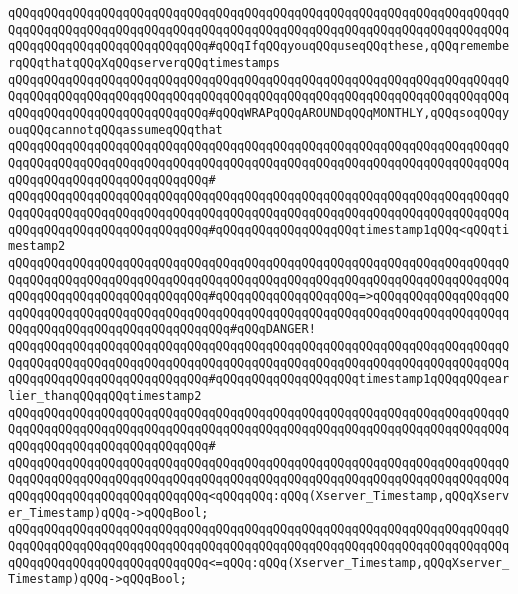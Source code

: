 \newline
\verb|qQQqqQQqqQQqqQQqqQQqqQQqqQQqqQQqqQQqqQQqqQQqqQQqqQQqqQQqqQQqqQQqqQQqqQQqqQQqqQQqqQQqqQQqqQQqqQQqqQQqqQQqqQQqqQQqqQQqqQQqqQQqqQQqqQQqqQQqqQQqqQQqqQQqqQQqqQQqqQQqqQQqqQQq#qQQqIfqQQqyouqQQquseqQQqthese,qQQqrememberqQQqthatqQQqXqQQqserverqQQqtimestamps|\newline
\verb|qQQqqQQqqQQqqQQqqQQqqQQqqQQqqQQqqQQqqQQqqQQqqQQqqQQqqQQqqQQqqQQqqQQqqQQqqQQqqQQqqQQqqQQqqQQqqQQqqQQqqQQqqQQqqQQqqQQqqQQqqQQqqQQqqQQqqQQqqQQqqQQqqQQqqQQqqQQqqQQqqQQqqQQq#qQQqWRAPqQQqAROUNDqQQqMONTHLY,qQQqsoqQQqyouqQQqcannotqQQqassumeqQQqthat|\newline
\verb|qQQqqQQqqQQqqQQqqQQqqQQqqQQqqQQqqQQqqQQqqQQqqQQqqQQqqQQqqQQqqQQqqQQqqQQqqQQqqQQqqQQqqQQqqQQqqQQqqQQqqQQqqQQqqQQqqQQqqQQqqQQqqQQqqQQqqQQqqQQqqQQqqQQqqQQqqQQqqQQqqQQqqQQq#|\newline
\verb|qQQqqQQqqQQqqQQqqQQqqQQqqQQqqQQqqQQqqQQqqQQqqQQqqQQqqQQqqQQqqQQqqQQqqQQqqQQqqQQqqQQqqQQqqQQqqQQqqQQqqQQqqQQqqQQqqQQqqQQqqQQqqQQqqQQqqQQqqQQqqQQqqQQqqQQqqQQqqQQqqQQqqQQq#qQQqqQQqqQQqqQQqqQQqtimestamp1qQQq<qQQqtimestamp2|\newline
\verb|qQQqqQQqqQQqqQQqqQQqqQQqqQQqqQQqqQQqqQQqqQQqqQQqqQQqqQQqqQQqqQQqqQQqqQQqqQQqqQQqqQQqqQQqqQQqqQQqqQQqqQQqqQQqqQQqqQQqqQQqqQQqqQQqqQQqqQQqqQQqqQQqqQQqqQQqqQQqqQQqqQQqqQQq#qQQqqQQqqQQqqQQqqQQq=>qQQqqQQqqQQqqQQqqQQqqQQqqQQqqQQqqQQqqQQqqQQqqQQqqQQqqQQqqQQqqQQqqQQqqQQqqQQqqQQqqQQqqQQqqQQqqQQqqQQqqQQqqQQqqQQqqQQqqQQq#qQQqDANGER!|\newline
\verb|qQQqqQQqqQQqqQQqqQQqqQQqqQQqqQQqqQQqqQQqqQQqqQQqqQQqqQQqqQQqqQQqqQQqqQQqqQQqqQQqqQQqqQQqqQQqqQQqqQQqqQQqqQQqqQQqqQQqqQQqqQQqqQQqqQQqqQQqqQQqqQQqqQQqqQQqqQQqqQQqqQQqqQQq#qQQqqQQqqQQqqQQqqQQqtimestamp1qQQqqQQqearlier_thanqQQqqQQqtimestamp2|\newline
\verb|qQQqqQQqqQQqqQQqqQQqqQQqqQQqqQQqqQQqqQQqqQQqqQQqqQQqqQQqqQQqqQQqqQQqqQQqqQQqqQQqqQQqqQQqqQQqqQQqqQQqqQQqqQQqqQQqqQQqqQQqqQQqqQQqqQQqqQQqqQQqqQQqqQQqqQQqqQQqqQQqqQQqqQQq#|\newline
\verb|qQQqqQQqqQQqqQQqqQQqqQQqqQQqqQQqqQQqqQQqqQQqqQQqqQQqqQQqqQQqqQQqqQQqqQQqqQQqqQQqqQQqqQQqqQQqqQQqqQQqqQQqqQQqqQQqqQQqqQQqqQQqqQQqqQQqqQQqqQQqqQQqqQQqqQQqqQQqqQQqqQQqqQQq<qQQqqQQq:qQQq(Xserver_Timestamp,qQQqXserver_Timestamp)qQQq->qQQqBool;|\newline
\verb|qQQqqQQqqQQqqQQqqQQqqQQqqQQqqQQqqQQqqQQqqQQqqQQqqQQqqQQqqQQqqQQqqQQqqQQqqQQqqQQqqQQqqQQqqQQqqQQqqQQqqQQqqQQqqQQqqQQqqQQqqQQqqQQqqQQqqQQqqQQqqQQqqQQqqQQqqQQqqQQqqQQqqQQq<=qQQq:qQQq(Xserver_Timestamp,qQQqXserver_Timestamp)qQQq->qQQqBool;|\newline
